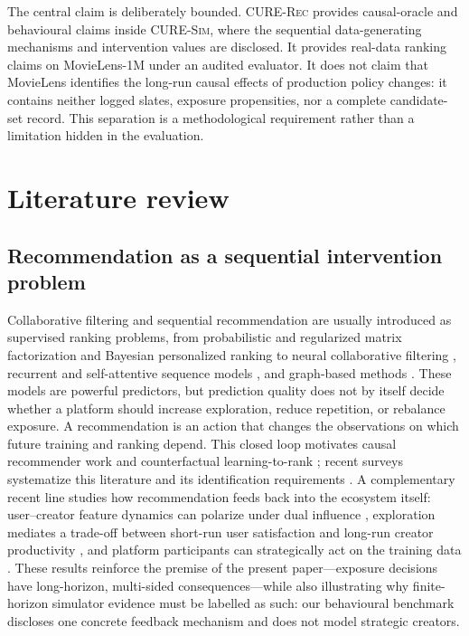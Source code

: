 \documentclass[pdflatex,sn-mathphys-num]{sn-jnl}
\theoremstyle{thmstyleone}
\theoremstyle{thmstyletwo}
\theoremstyle{thmstylethree}
\newcommand{\CURE}{\textsc{CURE-Rec}}
\newcommand{\Sim}{\textsc{CURE-Sim}}
\begin{document}
The central claim is deliberately bounded. \CURE{} provides causal-oracle and behavioural claims inside \Sim{}, where the sequential data-generating mechanisms and intervention values are disclosed. It provides real-data ranking claims on MovieLens-1M under an audited evaluator. It does not claim that MovieLens identifies the long-run causal effects of production policy changes: it contains neither logged slates, exposure propensities, nor a complete candidate-set record. This separation is a methodological requirement rather than a limitation hidden in the evaluation.

\section{Literature review}\label{sec:literature}

\subsection{Recommendation as a sequential intervention problem}

Collaborative filtering and sequential recommendation are usually introduced as supervised ranking problems, from probabilistic and regularized matrix factorization \cite{mnih2008probabilistic,koren2009matrix} and Bayesian personalized ranking \cite{rendle2009bpr,pan2008oneclass} to neural collaborative filtering \cite{he2017ncf}, recurrent and self-attentive sequence models \cite{hidasi2016gru,kang2018sasrec,sun2019bert4rec}, and graph-based methods \cite{wang2019ngcf,he2020lightgcn}. These models are powerful predictors, but prediction quality does not by itself decide whether a platform should increase exploration, reduce repetition, or rebalance exposure. A recommendation is an action that changes the observations on which future training and ranking depend. This closed loop motivates causal recommender work and counterfactual learning-to-rank \cite{swaminathan2015counterfactual,joachims2017unbiased,wang2023causal,bonner2018causal}; recent surveys systematize this literature and its identification requirements \cite{gao2024causal}. A complementary recent line studies how recommendation feeds back into the ecosystem itself: user--creator feature dynamics can polarize under dual influence \cite{lin2024polarization}, exploration mediates a trade-off between short-run user satisfaction and long-run creator productivity \cite{yao2024satisfaction}, and platform participants can strategically act on the training data \cite{baumann2024collective}. These results reinforce the premise of the present paper---exposure decisions have long-horizon, multi-sided consequences---while also illustrating why finite-horizon simulator evidence must be labelled as such: our behavioural benchmark discloses one concrete feedback mechanism and does not model strategic creators.
\end{document}
